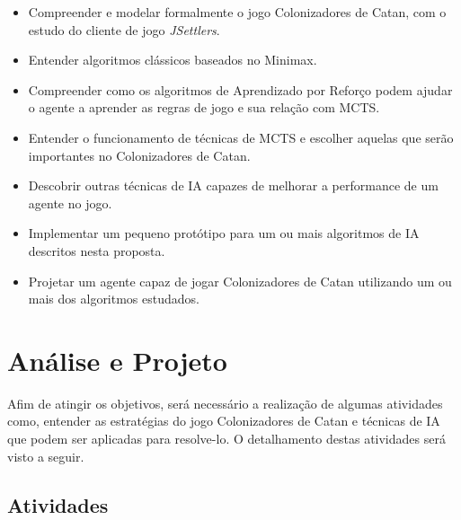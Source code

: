     \begin{itemize}

        \item Compreender e modelar formalmente o jogo Colonizadores de Catan, com o estudo do cliente de jogo \textit{JSettlers}.

        \item Entender algoritmos clássicos baseados no Minimax.

        \item Compreender como os algoritmos de Aprendizado por Reforço podem ajudar o agente a aprender as regras de jogo e sua relação com MCTS.

        \item Entender o funcionamento de técnicas de MCTS e escolher aquelas que serão importantes no Colonizadores de Catan.
        
        \item Descobrir outras técnicas de IA capazes de melhorar a performance de um agente no jogo.

        \item Implementar um pequeno protótipo para um ou mais algoritmos de IA descritos nesta proposta.

        \item Projetar um agente capaz de jogar Colonizadores de Catan utilizando um ou mais dos algoritmos estudados.
    
    \end{itemize}





\chapter{\label{chap:ana&proj}Análise e Projeto}

Afim de atingir os objetivos, será necessário a realização de algumas atividades como, entender as estratégias do jogo Colonizadores de Catan e técnicas de IA que podem ser aplicadas para resolve-lo. O detalhamento destas atividades será visto a seguir.

\section{\label{sec:ativ}Atividades}

